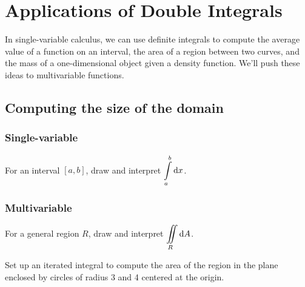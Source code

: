 \newlecture
\setcounter{chapter}{11}
\setcounter{section}{3}


\def\coursetopicnumber{III}
\def\topic{Applications of Double Integrals} %
\def\shorttopic{Applications of double integrals} %
\def\textbookname{Active Calculus} %
\def\shorttextbookname{AC} %
\def\textbooksection{11.4} %
\def\textbooksectionurl{https://activecalculus.org/vector/S-11-4-Double-Integrals-Applications.html} %
\def\handoutday{} %



\thispagestyle{plain}
\topstuff
\section{\topic{} \booklink{}}
\label{sec:double-integral-apps}
In single-variable calculus, we can use definite integrals to compute the average value of a function on an interval, the area of a region between two curves, and the mass of a one-dimensional object given a density function. We'll push these ideas to multivariable functions.

\subsection{Computing the size of the domain}
\subsubsection{Single-variable}
\begin{ex}
    For an interval $[a,b]$, draw and interpret $\displaystyle\int\limits_a^b \mathop{}\!\mathrm{d} x$.
\end{ex}

\vspace{1in}

\subsubsection{Multivariable}
\begin{ex}
    For a general region $R$, draw and interpret $\displaystyle\iint\limits_R \mathop{}\!\mathrm{d} A$.
\end{ex}

\vfill 

\begin{ex}
    Set up an iterated integral to compute the area of the region in the plane enclosed by circles of radius 3 and 4 centered at the origin.
\end{ex}

